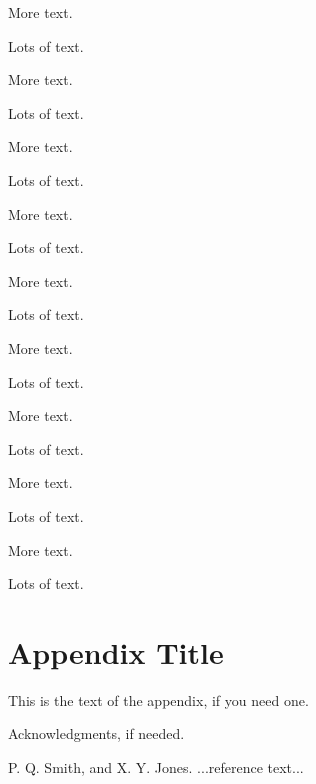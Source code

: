 \documentclass{sigplanconf}
\begin{document}
More text.

Lots of text.

More text.

Lots of text.

More text.

Lots of text.

More text.

Lots of text.

More text.

Lots of text.

More text.

Lots of text.

More text.

Lots of text.

More text.

Lots of text.

More text.

Lots of text.

\appendix
\section{Appendix Title}

This is the text of the appendix, if you need one.

\acks

Acknowledgments, if needed.





\begin{thebibliography}{}
\softraggedright

P. Q. Smith, and X. Y. Jones. ...reference text...

\end{thebibliography}
\end{document}
